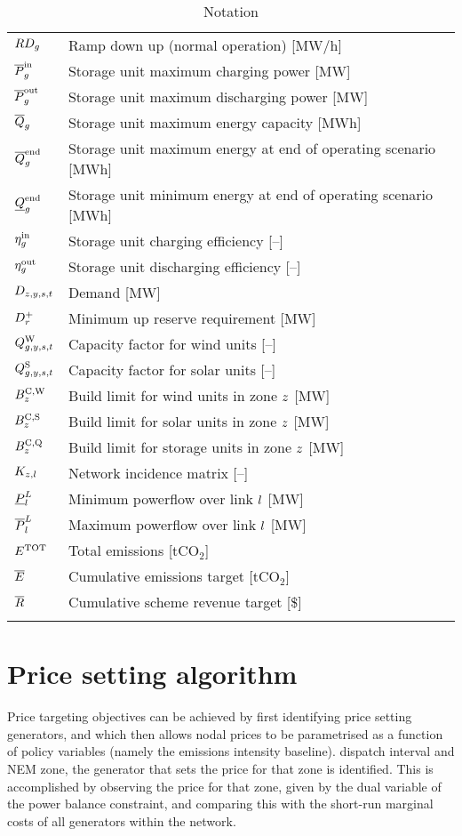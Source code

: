 \documentclass{article}
\begin{document}
\begin{longtable}{ p{}  p{}}
	$RD_{g}$ & Ramp down up (normal operation) [MW/h]\\
	$\overline{P}^{\mathrm{in}}_{g}$ & Storage unit maximum charging power [MW]\\
	$\overline{P}^{\mathrm{out}}_{g}$ & Storage unit maximum discharging power [MW]\\
	$\overline{Q}_{g}$ & Storage unit maximum energy capacity [MWh]\\
	$\overline{Q}^{\mathrm{end}}_{g}$ & Storage unit maximum energy at end of operating scenario [MWh]\\
	$\underline{Q}^{\mathrm{end}}_{g}$ & Storage unit minimum energy at end of operating scenario [MWh]\\
	$\eta_{g}^{\mathrm{in}}$ & Storage unit charging efficiency [--]\\
	$\eta_{g}^{\mathrm{out}}$ & Storage unit discharging efficiency [--]\\
	$D_{z,y,s,t}$ & Demand [MW]\\
	$D^{+}_{r}$ & Minimum up reserve requirement [MW]\\
	$Q_{g,y,s,t}^{\mathrm{W}}$ & Capacity factor for wind units [--]\\
	$Q_{g,y,s,t}^{\mathrm{S}}$ & Capacity factor for solar units [--]\\
	$B^{\mathrm{C,\mathrm{W}}}_{z}$ & Build limit for wind units in zone $z$ [MW]\\
	$B^{\mathrm{C,\mathrm{S}}}_{z}$ & Build limit for solar units in zone $z$ [MW]\\
	$B^{\mathrm{C,\mathrm{Q}}}_{z}$ & Build limit for storage units in zone $z$ [MW]\\
	$K_{z,l}$ & Network incidence matrix [--]\\
	$\underline{P}_{l}^{L}$ & Minimum powerflow over link $l$ [MW]\\
	$\overline{P}_{l}^{L}$ & Maximum powerflow over link $l$ [MW]\\
	$E^{\mathrm{TOT}}$ & Total emissions [tCO$_{2}$]\\
	$\overline{E}$ & Cumulative emissions target [tCO$_{2}$]\\
	$\overline{R}$ & Cumulative scheme revenue target [\$]\\
	\hline
	\caption{Notation}
\end{longtable}

\section{Price setting algorithm}
Price targeting objectives can be achieved by first identifying price setting generators, and which then allows nodal prices to be parametrised as a function of policy variables (namely the emissions intensity baseline). dispatch interval and NEM zone, the generator that sets the price for that zone is identified. This is accomplished by observing the price for that zone, given by the dual variable of the power balance constraint, and comparing this with the short-run marginal costs of all generators within the network. 
\end{document}
